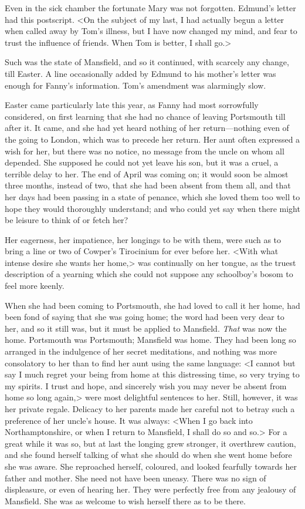 Even in the sick chamber the fortunate Mary was not forgotten. Edmund's letter had this postscript. <On the subject of my last, I had actually begun a letter when called away by Tom's illness, but I have now changed my mind, and fear to trust the influence of friends. When Tom is better, I shall go.>

Such was the state of Mansfield, and so it continued, with scarcely any change, till Easter. A line occasionally added by Edmund to his mother's letter was enough for Fanny's information. Tom's amendment was alarmingly slow.

Easter came particularly late this year, as Fanny had most sorrowfully considered, on first learning that she had no chance of leaving Portsmouth till after it. It came, and she had yet heard nothing of her return—nothing even of the going to London, which was to precede her return. Her aunt often expressed a wish for her, but there was no notice, no message from the uncle on whom all depended. She supposed he could not yet leave his son, but it was a cruel, a terrible delay to her. The end of April was coming on; it would soon be almost three months, instead of two, that she had been absent from them all, and that her days had been passing in a state of penance, which she loved them too well to hope they would thoroughly understand; and who could yet say when there might be leisure to think of or fetch her?

Her eagerness, her impatience, her longings to be with them, were such as to bring a line or two of Cowper's Tirocinium for ever before her. <With what intense desire she wants her home,> was continually on her tongue, as the truest description of a yearning which she could not suppose any schoolboy's bosom to feel more keenly.

When she had been coming to Portsmouth, she had loved to call it her home, had been fond of saying that she was going home; the word had been very dear to her, and so it still was, but it must be applied to Mansfield. \textit{That}  was now the home. Portsmouth was Portsmouth; Mansfield was home. They had been long so arranged in the indulgence of her secret meditations, and nothing was more consolatory to her than to find her aunt using the same language: <I cannot but say I much regret your being from home at this distressing time, so very trying to my spirits. I trust and hope, and sincerely wish you may never be absent from home so long again,> were most delightful sentences to her. Still, however, it was her private regale. Delicacy to her parents made her careful not to betray such a preference of her uncle's house. It was always: <When I go back into Northamptonshire, or when I return to Mansfield, I shall do so and so.> For a great while it was so, but at last the longing grew stronger, it overthrew caution, and she found herself talking of what she should do when she went home before she was aware. She reproached herself, coloured, and looked fearfully towards her father and mother. She need not have been uneasy. There was no sign of displeasure, or even of hearing her. They were perfectly free from any jealousy of Mansfield. She was as welcome to wish herself there as to be there.

